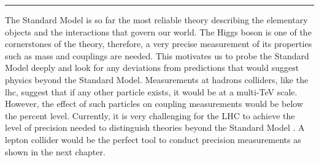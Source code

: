 \begin{center}
  \rule{0.5\textwidth}{.4pt}
\end{center}

The Standard Model is so far the most reliable theory describing the elementary objects and the interactions that govern our world. The Higgs boson is one of the cornerstones of the theory, therefore, a very precise measurement of its properties such as mass and couplings are needed. This motivates us to probe the Standard Model deeply and look for any deviations from predictions that would suggest physics beyond the Standard Model. Measurements at hadrons colliders, like the \acrlong{lhc}, suggest that if any other particle exists, it would be at a multi-TeV scale. However, the effect of such particles on coupling measurements would be below the percent level. Currently, it is very challenging for the LHC to achieve the level of precision needed to distinguish theories beyond the Standard Model \cite{CMS:2013xfa}. A lepton collider would be the perfect tool to conduct precision measurements as shown in the next chapter.
